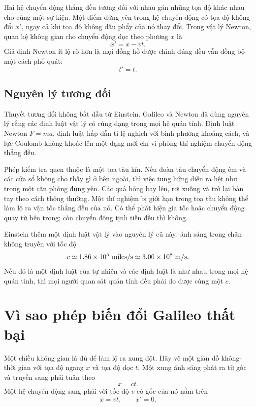 Hai hệ chuyển động thẳng đều tương đối với nhau gán những tọa độ khác nhau cho cùng một sự kiện. Một điểm đứng yên trong hệ chuyển động có tọa độ không đổi \(x'\), ngay cả khi tọa độ không dấu phẩy của nó thay đổi. Trong vật lý Newton, quan hệ không gian cho chuyển động dọc theo phương \(x\) là
\begin{equation}
x'=x-vt.
\label{eq:sr1-galilean-space}
\end{equation}
Giả định Newton ít lộ rõ hơn là mọi đồng hồ được chỉnh đúng đều vẫn đồng bộ một cách phổ quát:
\begin{equation}
t'=t.
\label{eq:sr1-absolute-time}
\end{equation}

\subsection{Nguyên lý tương đối}

Thuyết tương đối không bắt đầu từ Einstein. Galileo và Newton đã dùng nguyên lý rằng các định luật vật lý có cùng dạng trong mọi hệ quán tính. Định luật Newton \(F=ma\), định luật hấp dẫn tỉ lệ nghịch với bình phương khoảng cách, và lực Coulomb không khoác lên một dạng mới chỉ vì phòng thí nghiệm chuyển động thẳng đều.

Phép kiểm tra quen thuộc là một toa tàu kín. Nếu đoàn tàu chuyển động êm và các cửa sổ không cho thấy gì ở bên ngoài, thì việc tung hứng diễn ra hệt như trong một căn phòng đứng yên. Các quả bóng bay lên, rơi xuống và trở lại bàn tay theo cách thông thường. Một thí nghiệm bị giới hạn trong toa tàu không thể làm lộ ra vận tốc thẳng đều của nó. Có thể phát hiện gia tốc hoặc chuyển động quay từ bên trong; còn chuyển động tịnh tiến đều thì không.

Einstein thêm một định luật vật lý vào nguyên lý cũ này: ánh sáng trong chân không truyền với tốc độ
\begin{equation}
c \simeq 1.86\times 10^5\ {\rm miles/s}
   \simeq 3.00\times 10^8\ {\rm m/s}.
\end{equation}
Nếu đó là một định luật của tự nhiên và các định luật là như nhau trong mọi hệ quán tính, thì mọi người quan sát quán tính đều phải đo được cùng một \(c\).

\section{Vì sao phép biến đổi Galileo thất bại}

Một chiều không gian là đủ để làm lộ ra xung đột. Hãy vẽ một giản đồ không-thời gian với tọa độ ngang \(x\) và tọa độ dọc \(t\). Một xung ánh sáng phát ra từ gốc và truyền sang phải tuân theo
\begin{equation}
x=ct.
\label{eq:sr1-light-right}
\end{equation}
Một hệ chuyển động sang phải với tốc độ \(v\) có gốc của nó nằm trên
\begin{equation}
x=vt,
\qquad
x'=0.
\label{eq:sr1-moving-origin}
\end{equation}

